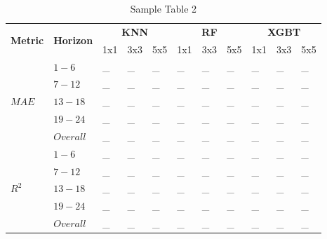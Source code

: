 \begin{table}[h]
\begin{center}
    \caption{Sample Table 2}
    \begin{tabular}{l l l l l l l l l l l}
        \toprule
        \multirow{2}{*}{\textbf{Metric}} & \multirow{2}{*}{\textbf{Horizon}} & \multicolumn{3}{c}{\textbf{KNN}} & \multicolumn{3}{c}{\textbf{RF}} & \multicolumn{3}{c}{\textbf{XGBT}}\\
        \cmidrule{3-11}
         &  & 1x1 & 3x3 & 5x5 & 1x1 & 3x3 & 5x5 & 1x1 & 3x3 & 5x5 \\
        \midrule
        \multirow{5}{*}{$MAE$} & $1 - 6$ & \_ & \_ & \_ & \_ & \_ & \_ & \_ & \_ & \_ \\
        & $7 - 12$ & \_ & \_ & \_ & \_ & \_ & \_ & \_ & \_ & \_ \\
        & $13 - 18$ & \_ & \_ & \_ & \_ & \_ & \_ & \_ & \_ & \_ \\
        & $19 - 24$ & \_ & \_ & \_ & \_ & \_ & \_ & \_ & \_ & \_ \\
        & $Overall$ & \_ & \_ & \_ & \_ & \_ & \_ & \_ & \_ & \_ \\
        \midrule
        \multirow{5}{*}{$R^2$} & $1 - 6$ & \_ & \_ & \_ & \_ & \_ & \_ & \_ & \_ & \_ \\
        & $7 - 12$ & \_ & \_ & \_ & \_ & \_ & \_ & \_ & \_ & \_ \\
        & $13 - 18$ & \_ & \_ & \_ & \_ & \_ & \_ & \_ & \_ & \_ \\
        & $19 - 24$ & \_ & \_ & \_ & \_ & \_ & \_ & \_ & \_ & \_ \\
        & $Overall$ & \_ & \_ & \_ & \_ & \_ & \_ & \_ & \_ & \_ \\
        \bottomrule
    \end{tabular}
\end{center}
\end{table}

\newpage